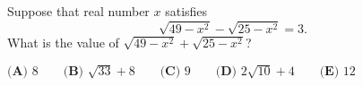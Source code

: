 Suppose that real number $x$ satisfies \[\sqrt{49-x^2}-\sqrt{25-x^2}=3.\] What is the value of $\sqrt{49-x^2}+\sqrt{25-x^2}$?

$\textbf{(A) }8\qquad\textbf{(B) }\sqrt{33}+8\qquad\textbf{(C) }9\qquad\textbf{(D) }2\sqrt{10}+4\qquad\textbf{(E) }12$